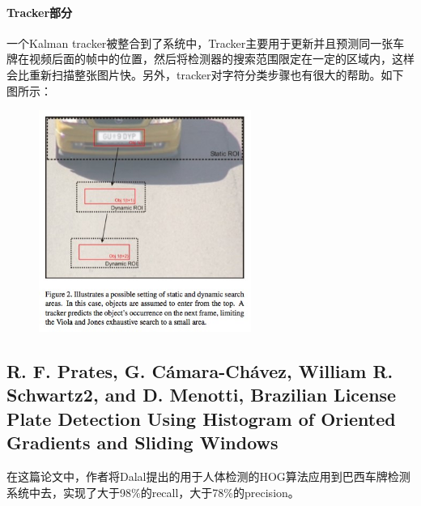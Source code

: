 \begin{enumerate}
\paragraph{Tracker部分}
一个Kalman tracker被整合到了系统中，Tracker主要用于更新并且预测同一张车牌在视频后面的帧中的位置，然后将检测器的搜索范围限定在一定的区域内，这样会比重新扫描整张图片快。另外，tracker对字符分类步骤也有很大的帮助。如下图所示：
\begin{figure}[H]
    \centering 
    \includegraphics[width=0.618\textwidth]{image/2_1_4_6.jpg}    
    \label{logic}
\end{figure}
\end{enumerate}

\subsection{R. F. Prates, G. Cámara-Chávez, William R. Schwartz2, and D. Menotti, Brazilian License Plate Detection Using Histogram of Oriented Gradients and Sliding Windows }
在这篇论文中，作者将Dalal提出的用于人体检测的HOG算法应用到巴西车牌检测系统中去，实现了大于98\%的recall，大于78\%的precision。

